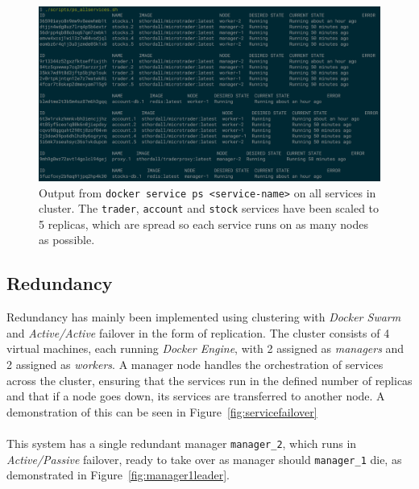 \begin{figure}[H]
\centering
\includegraphics[width=\textwidth]{../media/serviceps.png} 
\caption{Output from \texttt{docker service ps <service-name>} on all services
	in cluster. The \texttt{trader}, \texttt{account} and \texttt{stock} services
  have been scaled to 5 replicas, which are spread so each service runs on as
	many nodes as possible.}
\label{fig:serviceps}
\end{figure}

\subsection{Redundancy}
Redundancy has mainly been implemented using clustering with \textit{Docker Swarm}
and \textit{Active/Active} failover in the form of replication. The cluster
consists of 4 virtual machines, each running \textit{Docker Engine}, with 2
assigned as \textit{managers} and 2 assigned as \textit{workers}.
A manager node handles the orchestration of services across the cluster,
ensuring that the services run in the defined number of replicas and that if a
node goes down, its services are transferred to another node. A demonstration
of this can be seen in Figure~\ref{fig:servicefailover}
\\\\
This system has a single redundant manager \texttt{manager\_2}, which runs in
\textit{Active/Passive} failover, ready to take over as manager should 
\texttt{manager\_1} die, as demonstrated in Figure~\ref{fig:manager1leader}.

